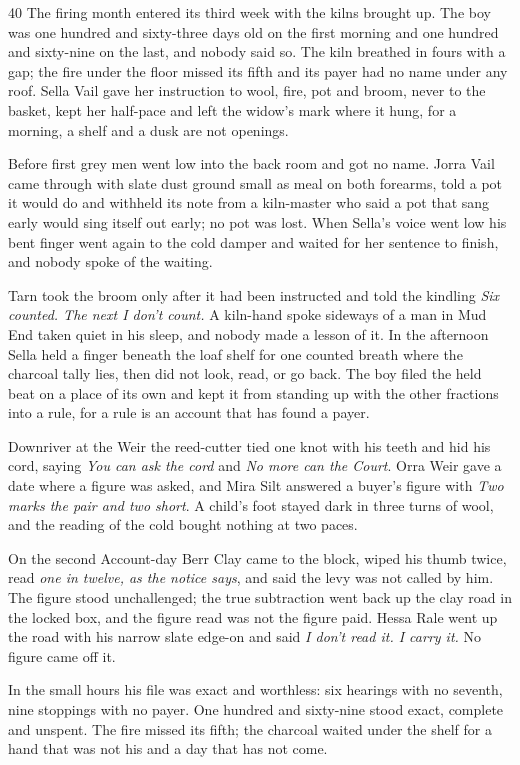 \begin{CRchronicle}{40}
The firing month entered its third week with the kilns brought up. The boy was one hundred and sixty-three days old on the first morning and one hundred and sixty-nine on the last, and nobody said so. The kiln breathed in fours with a gap; the fire under the floor missed its fifth and its payer had no name under any roof. Sella Vail gave her instruction to wool, fire, pot and broom, never to the basket, kept her half-pace and left the widow’s mark where it hung, for a morning, a shelf and a dusk are not openings.

Before first grey men went low into the back room and got no name. Jorra Vail came through with slate dust ground small as meal on both forearms, told a pot it would do and withheld its note from a kiln-master who said a pot that sang early would sing itself out early; no pot was lost. When Sella’s voice went low his bent finger went again to the cold damper and waited for her sentence to finish, and nobody spoke of the waiting.

Tarn took the broom only after it had been instructed and told the kindling \emph{Six counted. The next I don’t count.} A kiln-hand spoke sideways of a man in Mud End taken quiet in his sleep, and nobody made a lesson of it. In the afternoon Sella held a finger beneath the loaf shelf for one counted breath where the charcoal tally lies, then did not look, read, or go back. The boy filed the held beat on a place of its own and kept it from standing up with the other fractions into a rule, for a rule is an account that has found a payer.

Downriver at the Weir the reed-cutter tied one knot with his teeth and hid his cord, saying \emph{You can ask the cord} and \emph{No more can the Court}. Orra Weir gave a date where a figure was asked, and Mira Silt answered a buyer’s figure with \emph{Two marks the pair and two short}. A child’s foot stayed dark in three turns of wool, and the reading of the cold bought nothing at two paces.

On the second Account-day Berr Clay came to the block, wiped his thumb twice, read \emph{one in twelve, as the notice says}, and said the levy was not called by him. The figure stood unchallenged; the true subtraction went back up the clay road in the locked box, and the figure read was not the figure paid. Hessa Rale went up the road with his narrow slate edge-on and said \emph{I don’t read it. I carry it.} No figure came off it.

In the small hours his file was exact and worthless: six hearings with no seventh, nine stoppings with no payer. One hundred and sixty-nine stood exact, complete and unspent. The fire missed its fifth; the charcoal waited under the shelf for a hand that was not his and a day that has not come.
\end{CRchronicle}
